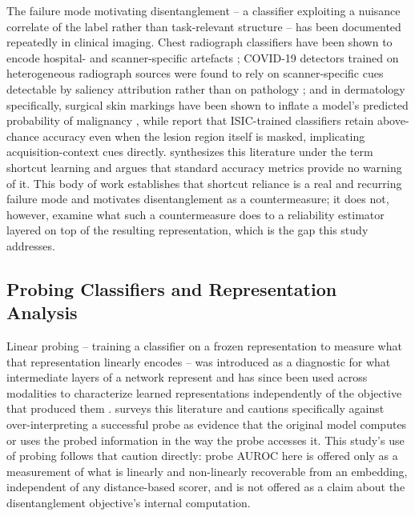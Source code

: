 The failure mode motivating disentanglement -- a classifier exploiting a nuisance correlate of the label rather than task-relevant structure -- has been documented repeatedly in clinical imaging. Chest radiograph classifiers have been shown to encode hospital- and scanner-specific artefacts \citep{zech2018variable}; COVID-19 detectors trained on heterogeneous radiograph sources were found to rely on scanner-specific cues detectable by saliency attribution rather than on pathology \citep{degrave2021ai}; and in dermatology specifically, surgical skin markings have been shown to inflate a model's predicted probability of malignancy \citep{winkler2019association}, while \citet{bissoto2020debiasing} report that ISIC-trained classifiers retain above-chance accuracy even when the lesion region itself is masked, implicating acquisition-context cues directly. \citet{geirhos2020shortcut} synthesizes this literature under the term shortcut learning and argues that standard accuracy metrics provide no warning of it. This body of work establishes that shortcut reliance is a real and recurring failure mode and motivates disentanglement as a countermeasure; it does not, however, examine what such a countermeasure does to a reliability estimator layered on top of the resulting representation, which is the gap this study addresses.

\subsection{Probing Classifiers and Representation Analysis}
\label{sec:rw-probing}

Linear probing -- training a classifier on a frozen representation to measure what that representation linearly encodes -- was introduced as a diagnostic for what intermediate layers of a network represent \citep{alain2016understanding} and has since been used across modalities to characterize learned representations independently of the objective that produced them \citep{hewitt2019designing}. \citet{belinkov2022probing} surveys this literature and cautions specifically against over-interpreting a successful probe as evidence that the original model computes or uses the probed information in the way the probe accesses it. This study's use of probing follows that caution directly: probe AUROC here is offered only as a measurement of what is linearly and non-linearly recoverable from an embedding, independent of any distance-based scorer, and is not offered as a claim about the disentanglement objective's internal computation.

